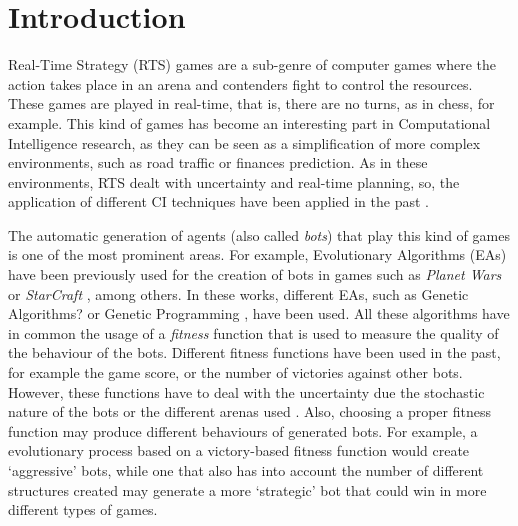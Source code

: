 \documentclass[preprint]{elsarticle}
\begin{document}
\section{Introduction}
\noindent 

Real-Time Strategy (RTS) games are a sub-genre of computer games where the action takes place in an arena and contenders fight to control the resources. These games are played in real-time, that is, there are no turns, as in chess, for example. This kind of games has become an interesting part in Computational Intelligence research, as they can be seen as a simplification of more complex environments, such as road traffic or finances prediction. As in these environments, RTS dealt with uncertainty and real-time planning, so, the application of different CI techniques have been applied in the past \cite{Lara2013review}.

The automatic generation of agents (also called {\em bots}) that play this kind of games is one of the most prominent areas. For example, Evolutionary Algorithms (EAs) have been previously used for the creation of bots in games such as {\em Planet Wars} \cite{Genebot_CEC11,ExpGenebot_CIG2012} or {\em StarCraft} \cite{Garcia15Starcraft}, among others. In these works, different EAs, such as Genetic Algorithms?\cite{ExpGenebot_CIG2012} or Genetic Programming \cite{Garcia14Treedepth}, have been used. All these algorithms have in common the usage of a {\em fitness} function that is used to measure the quality of the behaviour of the bots. Different fitness functions have been used in the past, for example the game score, or the number of victories against other bots. However, these functions have to deal with the uncertainty due the stochastic nature of the bots or the different arenas used \cite{wilcoxon:ga}. Also, choosing a proper fitness function may produce different behaviours of generated bots. For example, a evolutionary process based on a victory-based fitness function would create `aggressive' bots, while one that also has into account the number of different structures created may generate a more `strategic' bot that could win in more different types of games. 
\end{document}
